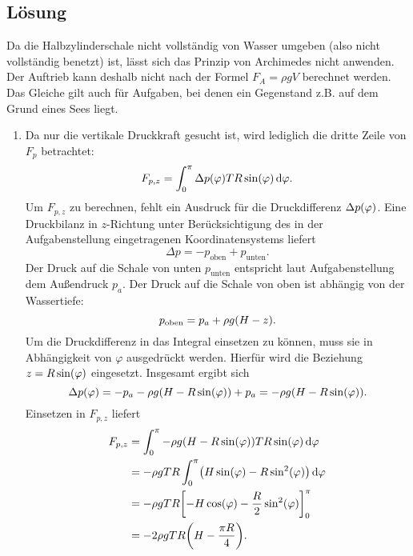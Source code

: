\documentclass{exercise}
\begin{document}
    \subsection*{Lösung}
    Da die Halbzylinderschale nicht vollständig von Wasser umgeben (also nicht vollständig benetzt) ist, lässt sich das Prinzip von Archimedes nicht anwenden.
    Der Auftrieb kann deshalb nicht nach der Formel \(F_A = \rho gV\) berechnet werden.
    Das Gleiche gilt auch für Aufgaben, bei denen ein Gegenstand z.B. auf dem Grund eines Sees liegt.
    \begin{enumerate}
        \item Da nur die vertikale Druckkraft gesucht ist, wird lediglich die dritte Zeile von \(F_p\) betrachtet:
        \[
            F_{p, z} = \int_0^\pi \Delta p\parentheses*{\varphi}TR\sin\parentheses*{\varphi}\d\varphi.
        \]
        Um \(F_{p, z}\) zu berechnen, fehlt ein Ausdruck für die Druckdifferenz \(\Delta p\parentheses*{\varphi}\).
        Eine Druckbilanz in \(z\)-Richtung unter Berücksichtigung des in der Aufgabenstellung eingetragenen Koordinatensystems liefert
        \[
            \Delta p = -p_{\text{oben}} + p_{\text{unten}}.
        \]
        Der Druck auf die Schale von unten \(p_{\text{unten}}\) entspricht laut Aufgabenstellung dem Außendruck \(p_a\).
        Der Druck auf die Schale von oben ist abhängig von der Wassertiefe:
        \[
            p_{\text{oben}} = p_a + \rho g\parentheses*{H - z}.
        \]
        Um die Druckdifferenz in das Integral einsetzen zu können, muss sie in Abhängigkeit von \(\varphi\) ausgedrückt werden.
        Hierfür wird die Beziehung \(z = R\sin\parentheses*{\varphi}\) eingesetzt.
        Insgesamt ergibt sich
        \[
            \Delta p\parentheses*{\varphi} = -p_a - \rho g\parentheses*{H - R\sin\parentheses*{\varphi}} + p_a = -\rho g\parentheses*{H - R\sin\parentheses*{\varphi}}.
        \]
        Einsetzen in \(F_{p, z}\) liefert
        \begin{align*}
            F_{p, z} &= \int_0^\pi -\rho g\parentheses*{H - R\sin\parentheses*{\varphi}}TR\sin\parentheses*{\varphi}\d\varphi\\
            &= -\rho gTR\int_0^\pi \parentheses*{H\sin\parentheses*{\varphi} - R\sin^2\parentheses*{\varphi}}\d\varphi\\
            &= -\rho gTR\brackets*{-H\cos\parentheses*{\varphi} - \frac{R}{2}\sin^2\parentheses*{\varphi}}_0^\pi\\
            &= -2\rho gTR\parentheses*{H - \frac{\pi R}{4}}.
        \end{align*}

\end{enumerate}
\end{document}

